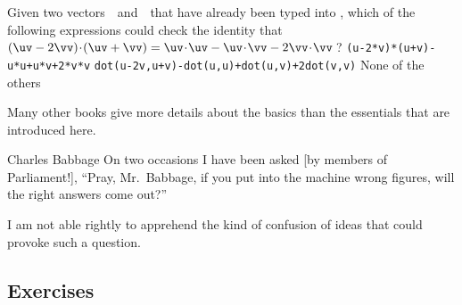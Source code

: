 \begin{activity}
Given two vectors~\uv\ and~\vv\ that have already been typed into \script,
which of the following expressions could check the identity that \((\uv-2\vv)\cdot(\uv+\vv)=\uv\cdot\uv-\uv\cdot\vv-2\vv\cdot\vv\)\,?
{\tt (u-2*v)*(u+v)-u*u+u*v+2*v*v}
{\tt dot(u-2v,u+v)-dot(u,u)+dot(u,v)+2dot(v,v)}
{None of the others}
\end{activity}




Many other books \cite[\S\S1.1--3, e.g.]{Quarteroni2006} give more details about the basics than the essentials that are introduced here.




\begin{quoted}{Charles Babbage}%
On two occasions I have been asked [by members of 
Parliament!], ``Pray, Mr.~Babbage, if you put into the machine wrong figures, will the right answers come out?''

I am not able rightly to apprehend the kind of confusion of ideas that could provoke such a question.
\end{quoted}




\subsection{Exercises}


